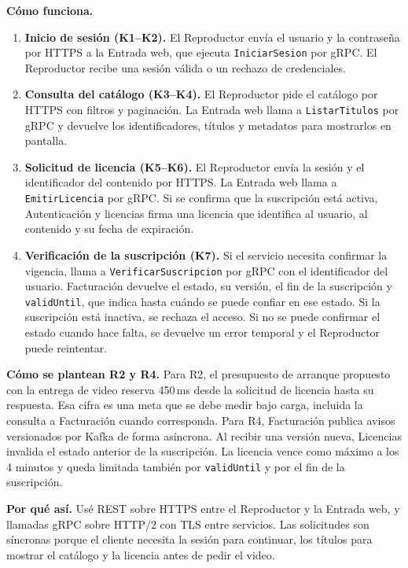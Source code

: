 \documentclass[11pt,a4paper]{article}
\begin{document}
	\textbf{C\'omo funciona.}
	\begin{enumerate}[leftmargin=*,itemsep=2pt]
		\item \textbf{Inicio de sesi\'on (K1--K2).} El Reproductor env\'ia el usuario y la contrase\~na por HTTPS a la Entrada web, que ejecuta \texttt{IniciarSesion} por gRPC. El Reproductor recibe una sesi\'on v\'alida o un rechazo de credenciales.
		\item \textbf{Consulta del cat\'alogo (K3--K4).} El Reproductor pide el cat\'alogo por HTTPS con filtros y paginaci\'on. La Entrada web llama a \texttt{ListarTitulos} por gRPC y devuelve los identificadores, t\'itulos y metadatos para mostrarlos en pantalla.
		\item \textbf{Solicitud de licencia (K5--K6).} El Reproductor env\'ia la sesi\'on y el identificador del contenido por HTTPS. La Entrada web llama a \texttt{EmitirLicencia} por gRPC. Si se confirma que la suscripci\'on est\'a activa, Autenticaci\'on y licencias firma una licencia que identifica al usuario, al contenido y su fecha de expiraci\'on.
		\item \textbf{Verificaci\'on de la suscripci\'on (K7).} Si el servicio necesita confirmar la vigencia, llama a \texttt{VerificarSuscripcion} por gRPC con el identificador del usuario. Facturaci\'on devuelve el estado, su versi\'on, el fin de la suscripci\'on y \texttt{validUntil}, que indica hasta cu\'ando se puede confiar en ese estado. Si la suscripci\'on est\'a inactiva, se rechaza el acceso. Si no se puede confirmar el estado cuando hace falta, se devuelve un error temporal y el Reproductor puede reintentar.
	\end{enumerate}

	\textbf{C\'omo se plantean R2 y R4.} Para R2, el presupuesto de arranque propuesto con la entrega de video reserva 450\,ms desde la solicitud de licencia hasta su respuesta. Esa cifra es una meta que se debe medir bajo carga, incluida la consulta a Facturaci\'on cuando corresponda. Para R4, Facturaci\'on publica avisos versionados por Kafka de forma as\'incrona. Al recibir una versi\'on nueva, Licencias invalida el estado anterior de la suscripci\'on. La licencia vence como m\'aximo a los 4 minutos y queda limitada tambi\'en por \texttt{validUntil} y por el fin de la suscripci\'on.

	\textbf{Por qu\'e as\'i.} Us\'e REST sobre HTTPS entre el Reproductor y la Entrada web, y llamadas gRPC sobre HTTP/2 con TLS entre servicios. Las solicitudes son s\'incronas porque el cliente necesita la sesi\'on para continuar, los t\'itulos para mostrar el cat\'alogo y la licencia antes de pedir el video.
\end{document}
